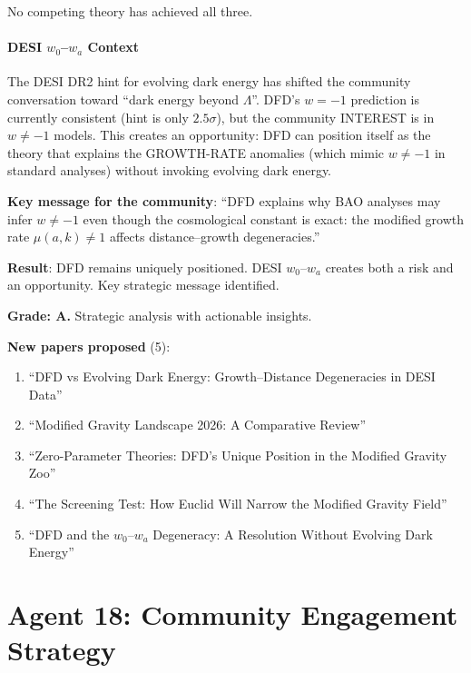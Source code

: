 \documentclass[11pt,a4paper]{article}
\begin{document}
No competing theory has achieved all three.

\subsection{DESI $w_0$--$w_a$ Context}

The DESI DR2 hint for evolving dark energy has shifted the community conversation toward ``dark energy beyond $\Lambda$''. DFD's $w = -1$ prediction is currently consistent (hint is only $2.5\sigma$), but the community INTEREST is in $w \neq -1$ models. This creates an opportunity: DFD can position itself as the theory that explains the GROWTH-RATE anomalies (which mimic $w \neq -1$ in standard analyses) without invoking evolving dark energy.

\textbf{Key message for the community}: ``DFD explains why BAO analyses may infer $w \neq -1$ even though the cosmological constant is exact: the modified growth rate $\mu(a,k) \neq 1$ affects distance--growth degeneracies.''

\begin{tcolorbox}[colback=blue!5!white, colframe=blue!60!black, title={Agent 17: Competition Landscape}]
\textbf{Result}: DFD remains uniquely positioned. DESI $w_0$--$w_a$ creates both a risk and an opportunity. Key strategic message identified.

\textbf{Grade: A.} Strategic analysis with actionable insights.

\textbf{New papers proposed} (5):
\begin{enumerate}
\item ``DFD vs Evolving Dark Energy: Growth--Distance Degeneracies in DESI Data''
\item ``Modified Gravity Landscape 2026: A Comparative Review''
\item ``Zero-Parameter Theories: DFD's Unique Position in the Modified Gravity Zoo''
\item ``The Screening Test: How Euclid Will Narrow the Modified Gravity Field''
\item ``DFD and the $w_0$--$w_a$ Degeneracy: A Resolution Without Evolving Dark Energy''
\end{enumerate}
\end{tcolorbox}


\part{Agent 18: Community Engagement Strategy}
\label{part:community}
\end{document}
